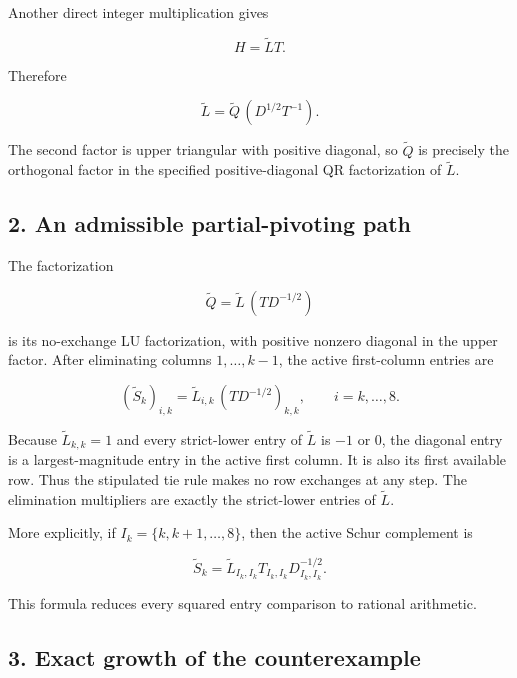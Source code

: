 \documentclass[10pt,a4paper]{article}
\begin{document}
Another direct integer multiplication gives

\nopagebreak[4]

\[
H=\widetilde L T.
\]

Therefore

\nopagebreak[4]

\[
\widetilde L=\widetilde Q\,(D^{1/2}T^{-1}).
\]

The second factor is upper triangular with positive diagonal, so
\(\widetilde Q\) is precisely the orthogonal factor in the specified
positive-diagonal QR factorization of \(\widetilde L\).

\subsection{2. An admissible partial-pivoting
path}\label{an-admissible-partial-pivoting-path}

The factorization

\nopagebreak[4]

\[
\widetilde Q=\widetilde L\,(TD^{-1/2})
\]

is its no-exchange LU factorization, with positive nonzero diagonal in
the upper factor. After eliminating columns \(1,\ldots,k-1\), the active
first-column entries are

\nopagebreak[4]

\[
(\widetilde S_k)_{i,k}
=\widetilde L_{i,k}\,(TD^{-1/2})_{k,k},
\qquad i=k,\ldots,8.
\]

Because \(\widetilde L_{k,k}=1\) and every strict-lower entry of
\(\widetilde L\) is \(-1\) or \(0\), the diagonal entry is a
largest-magnitude entry in the active first column. It is also its first
available row. Thus the stipulated tie rule makes no row exchanges at
any step. The elimination multipliers are exactly the strict-lower
entries of \(\widetilde L\).

More explicitly, if \(I_k=\{k,k+1,\ldots,8\}\), then the active Schur
complement is

\nopagebreak[4]

\[
\widetilde S_k
=\widetilde L_{I_k,I_k}T_{I_k,I_k}D_{I_k,I_k}^{-1/2}.
\]

This formula reduces every squared entry comparison to rational
arithmetic.

\subsection{3. Exact growth of the
counterexample}\label{exact-growth-of-the-counterexample}
\end{document}
